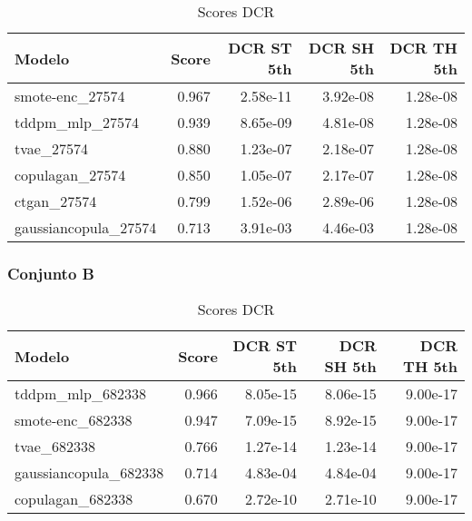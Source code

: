    \begin{table}[H]
    \centering
    \caption{Scores DCR}
    \label{dcr-eco-a-scores}
    \begin{tabular}{|l|r|r|r|r|}
        \hline
        \rowcolor[gray]{0.8}
        Modelo & \textbf{Score} & DCR ST 5th & DCR SH 5th & DCR TH 5th \\ \hline
       smote-enc\_27574         & 0.967 & 2.58e-11 & 3.92e-08 & 1.28e-08 \\ \hline
       tddpm\_mlp\_27574        & 0.939 & 8.65e-09 & 4.81e-08 & 1.28e-08 \\ \hline
       tvae\_27574              & 0.880 & 1.23e-07 & 2.18e-07 & 1.28e-08 \\ \hline
       copulagan\_27574         & 0.850 & 1.05e-07 & 2.17e-07 & 1.28e-08 \\ \hline
       ctgan\_27574             & 0.799 & 1.52e-06 & 2.89e-06 & 1.28e-08 \\ \hline
       gaussiancopula\_27574    & 0.713 & 3.91e-03 & 4.46e-03 & 1.28e-08 \\ \hline
    \end{tabular}
\end{table}


\subsubsection{Conjunto B}
\label{ds-conjunto-b}

\begin{table}[H]
    \centering
    \caption{Scores DCR}
    \label{dcr-eco-b-scores}
    \begin{tabular}{|l|r|r|r|r|}
        \hline
        \rowcolor[gray]{0.8}
        Modelo & \textbf{Score} & DCR ST 5th & DCR SH 5th & DCR TH 5th \\ \hline
        tddpm\_mlp\_682338          & 0.966 & 8.05e-15 & 8.06e-15 & 9.00e-17 \\ \hline
        smote-enc\_682338           & 0.947 & 7.09e-15 & 8.92e-15 & 9.00e-17 \\ \hline
        tvae\_682338                & 0.766 & 1.27e-14 & 1.23e-14 & 9.00e-17 \\ \hline
        gaussiancopula\_682338      & 0.714 & 4.83e-04 & 4.84e-04 & 9.00e-17 \\ \hline
        copulagan\_682338           & 0.670 & 2.72e-10 & 2.71e-10 & 9.00e-17 \\ \hline
    \end{tabular}
\end{table}
